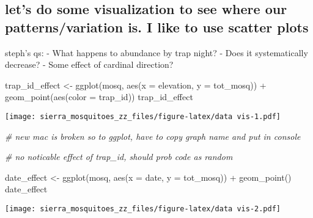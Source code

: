\documentclass[
]{article}
\newenvironment{Shaded}{\begin{snugshade}}{\end{snugshade}}
\newcommand{\AttributeTok}[1]{\textcolor[rgb]{0.77,0.63,0.00}{#1}}
\newcommand{\CommentTok}[1]{\textcolor[rgb]{0.56,0.35,0.01}{\textit{#1}}}
\newcommand{\FunctionTok}[1]{\textcolor[rgb]{0.00,0.00,0.00}{#1}}
\newcommand{\NormalTok}[1]{#1}
\newcommand{\OtherTok}[1]{\textcolor[rgb]{0.56,0.35,0.01}{#1}}
\newcommand{\SpecialCharTok}[1]{\textcolor[rgb]{0.00,0.00,0.00}{#1}}
\begin{document}
\hypertarget{lets-do-some-visualization-to-see-where-our-patternsvariation-is.-i-like-to-use-scatter-plots}{%
\subsection{let's do some visualization to see where our
patterns/variation is. I like to use scatter
plots}\label{lets-do-some-visualization-to-see-where-our-patternsvariation-is.-i-like-to-use-scatter-plots}}

steph's qs: - What happens to abundance by trap night? - Does it
systematically decrease? - Some effect of cardinal direction?

\begin{Shaded}
\begin{Highlighting}[]
\NormalTok{trap\_id\_effect }\OtherTok{\textless{}{-}} \FunctionTok{ggplot}\NormalTok{(mosq, }\FunctionTok{aes}\NormalTok{(}\AttributeTok{x =}\NormalTok{ elevation, }\AttributeTok{y =}\NormalTok{ tot\_mosq)) }\SpecialCharTok{+}
  \FunctionTok{geom\_point}\NormalTok{(}\FunctionTok{aes}\NormalTok{(}\AttributeTok{color =}\NormalTok{ trap\_id))}
\NormalTok{trap\_id\_effect}
\end{Highlighting}
\end{Shaded}

\texttt{[image: sierra\_mosquitoes\_zz\_files/figure-latex/data vis-1.pdf]}

\begin{Shaded}
\begin{Highlighting}[]
\CommentTok{\# new mac is broken so to ggplot, have to copy graph name and put in console}

\CommentTok{\# no noticable effect of trap\_id, should prob code as random}

\NormalTok{date\_effect }\OtherTok{\textless{}{-}} \FunctionTok{ggplot}\NormalTok{(mosq, }\FunctionTok{aes}\NormalTok{(}\AttributeTok{x =}\NormalTok{ date, }\AttributeTok{y =}\NormalTok{ tot\_mosq)) }\SpecialCharTok{+}
  \FunctionTok{geom\_point}\NormalTok{()}
\NormalTok{date\_effect}
\end{Highlighting}
\end{Shaded}

\texttt{[image: sierra\_mosquitoes\_zz\_files/figure-latex/data vis-2.pdf]}
\end{document}
